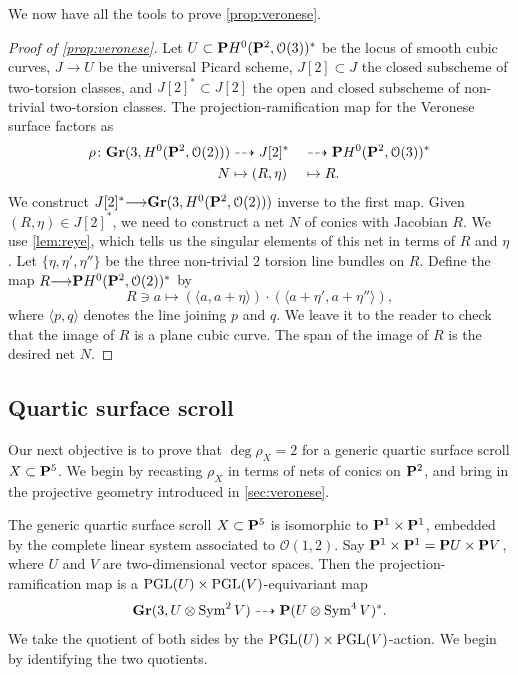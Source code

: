 \documentclass[11pt,reqno]{amsart}
\theoremstyle{plain}
\theoremstyle{definition}
\theoremstyle{remark}
\numberwithin{equation}{section}
\renewcommand{\to}{{\longrightarrow}}
\numberwithin{equation}{section}
\renewcommand{\O}{\mathcal O}
\begin{document}
We now have all the tools to prove \autoref{prop:veronese}.
\begin{proof}[Proof of \autoref{prop:veronese}]
  Let $U \subset \P H^0(\P^2, \O(3))^*$ be the locus of smooth cubic curves, $J \to U$ be the universal Picard scheme, $J[2] \subset J$ the closed subscheme of two-torsion classes, and $J[2]^* \subset J[2]$ the open and closed subscheme of non-trivial two-torsion classes.
  The projection-ramification map for the Veronese surface factors as
  \begin{alignat*}{2}
    \rho \from \Gr(3, H^0(\P^2, \O(2))) &\dashrightarrow J[2]^* &&\dashrightarrow \P H^0(\P^2, \O(3))^*\\
    N &\mapsto (R, \eta) &&\mapsto R.
  \end{alignat*}
  We construct $J[2]^* \to \Gr(3,H^0(\P^2, \O(2)))$ inverse to the first map.
  Given $(R, \eta) \in J[2]^*$, we need to construct a net $N$ of conics with Jacobian $R$.
  We use \autoref{lem:reye}, which tells us the singular elements of this net in terms of $R$ and $\eta$.
  Let $\{\eta, \eta', \eta''\}$ be the three non-trivial 2 torsion line bundles on $R$.
  Define the map $R \to \P H^0(\P^2, \O(2))^*$ by
  \[ R \ni a \mapsto \left(\langle {a, a+\eta} \rangle\right) \cdot \left(\langle {a+\eta', a+\eta''} \rangle \right),\]
  where $\langle {p,q} \rangle$ denotes the line joining $p$ and $q$.
  We leave it to the reader to check that the image of $R$ is a plane cubic curve.
  The span of the image of $R$ is the desired net $N$.  
\end{proof}

\subsection{Quartic surface scroll}\label{sec:quartic_scroll}
Our next objective is to prove that $ \deg \rho_{X} = 2$ for a generic quartic surface scroll $X \subset \P^{5}$.
We begin by recasting $\rho_X$ in terms of nets of conics on $\P^2$, and bring in the projective geometry introduced in \autoref{sec:veronese}.

The generic quartic surface scroll $X \subset \P^5$ is isomorphic to $\P^1 \times \P^1$, embedded by the complete linear system associated to $\O(1,2)$.
Say $\P^1 \times \P^1 = \P U \times \P V$, where $U$ and $V$ are two-dimensional vector spaces.
Then the projection-ramification map is a $\PGL(U) \times \PGL(V)$-equivariant map
\[
  \Gr(3, U \otimes \Sym^2 V) \dashrightarrow \P(U \otimes \Sym^4 V)^*.
\]
We take the quotient of both sides by the $\PGL(U) \times \PGL(V)$-action.
We begin by identifying the two quotients.
\end{document}
